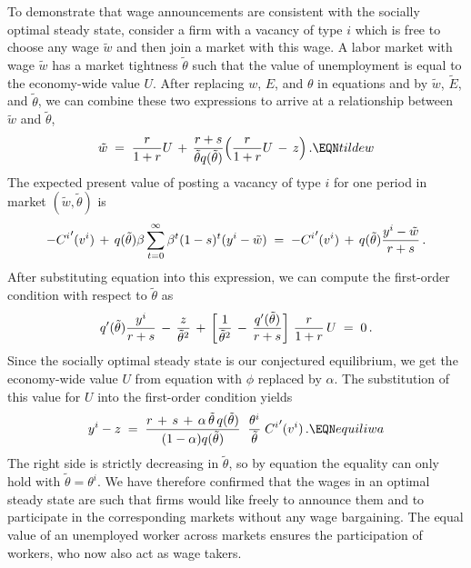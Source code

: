 To demonstrate that wage announcements are consistent with the
socially optimal steady state, consider a firm with a vacancy
of type $i$ which is free to choose any wage $\tilde w$ and
then join a market with this wage. A labor market with wage
$\tilde w$ has a market tightness $\tilde \theta$ such that
the value of unemployment is equal to the economy-wide value
$U$. After replacing $w$, $E$, and $\theta$ in equations 
and  by $\tilde w$, $\tilde E$, and $\tilde \theta$,
we can combine these two expressions to arrive at a
relationship between $\tilde w$ and $\tilde \theta$,
$$
\tilde w \;=\; {r \over 1+r} U \,+\, {r+s \over
\tilde \theta q(\tilde \theta)} \Bigl({r \over 1+r} U \,-\, z\Bigr) \,.
                                                        \EQN tildew
$$
The expected present value of posting a vacancy of type $i$
for one period in market $(\tilde w, \tilde \theta)$ is
$$
-{C^i}'(v^i) \,+\, q(\tilde \theta) \beta \sum_{t=0}^\infty
\beta^t (1-s)^t (y^i-\tilde w) \;=\;
-{C^i}'(v^i) \,+\, q(\tilde \theta) {y^i-\tilde w \over r+s} \,.
$$
After substituting equation  into this expression, we can
compute the first-order condition with respect to $\tilde \theta$ as
$$
q'(\tilde \theta) {y^i \over r+s} \,-\, {z \over \tilde \theta^{2}}
\,+\, \left[{1\over\tilde \theta^{2}} \,-\,
 {q'(\tilde \theta) \over r+s} \right]
\,{r \over 1+r}\, U \;=\; 0\,.
$$
Since the socially optimal steady state is our conjectured equilibrium,
we get the economy-wide value $U$ from equation  with $\phi$
replaced by $\alpha$. The substitution of this value for $U$ into the
first-order condition yields
$$
y^i-z \;=\; {r\,+\,s\,+\,\alpha\,\tilde \theta\,q(\tilde \theta) \over
         (1-\alpha) q(\tilde \theta)  } \;\;
{\theta^i \over \tilde \theta} \; {C^i}'(v^i) \,.  \EQN equiliwa
$$
The right side is strictly decreasing in $\tilde \theta$, so by
equation  the equality can only hold with
$\tilde \theta=\theta^i$.
We have therefore confirmed that the wages in an optimal steady state
are such that firms would like freely to  announce them and to participate
in the corresponding markets without any wage bargaining. The equal
value of an unemployed worker across markets  ensures  the
participation of workers, who now also act as wage takers.

\def\lege{\raise.3ex\hbox{$>$\kern-.75em\lower1ex\hbox{$<$}}}
